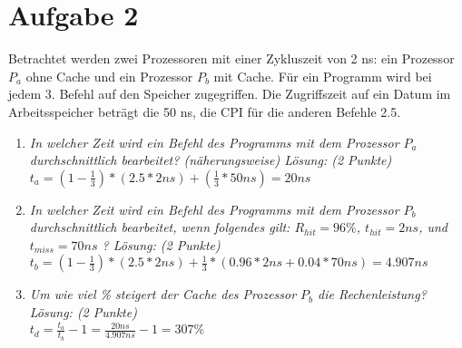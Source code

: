 \documentclass[10pt]{article}
\begin{document}
\newpage

\section*{Aufgabe 2}
Betrachtet werden zwei Prozessoren mit einer Zykluszeit von 2 ns: ein Prozessor $P_a$ ohne Cache und ein Prozessor $P_b$ mit Cache. Für ein Programm wird bei jedem 3. Befehl auf den Speicher zugegriffen. Die Zugriffszeit auf ein Datum im Arbeitsspeicher beträgt die 50 ns, die CPI für die anderen Befehle 2.5.
\begin{enumerate}[label=\alph*)]
	\item
		\textit{In welcher Zeit wird ein Befehl des Programms mit dem Prozessor $P_a$ durchschnittlich bearbeitet? (näherungsweise) Lösung: (2 Punkte)}\\
		$t_a = (1-\frac{1}{3}) * (2.5 * 2ns) + (\frac{1}{3} * 50ns) = 20ns $
	\item 
		\textit{In welcher Zeit wird ein Befehl des Programms mit dem Prozessor $P_b$ durchschnittlich bearbeitet, wenn folgendes gilt: $R_{hit}= 96\%$, $t_{hit} = 2 ns $,  und $t_{miss}= 70 ns$ ? Lösung: (2 Punkte)}\\
		$t_b = (1-\frac{1}{3}) * (2.5 * 2ns) + \frac{1}{3} * (0.96 * 2ns + 0.04 * 70ns) = 4.907ns $
	\item
		\textit{Um wie viel \% steigert der Cache des Prozessor $P_b$ die Rechenleistung? Lösung: (2 Punkte)}\\
		$t_d = \frac{t_a}{t_b} - 1 = \frac{20ns}{4.907ns} -1 = 307\%$
\end{enumerate}

\newpage
\end{document}
